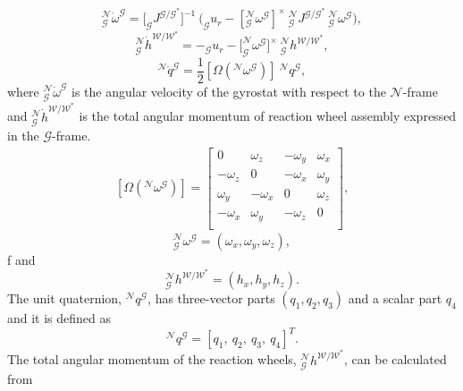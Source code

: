 \documentclass[journal ]{new-aiaa}
\begin{document}
\begin{equation} \label{Euler_RBD1}
_\mathcal{G}^\mathcal{N}\dot{\omega}^\mathcal{G} =\big[ _\mathcal{G}J^{\mathcal{G/G^*}}\big]^{-1}\ \Big( _\mathcal{G}u_r- [_\mathcal{G}^\mathcal{N}\omega^\mathcal{G}]^{ \times} \ _\mathcal{G}^\mathcal{N}J^{\mathcal{G/G^*}}\ _\mathcal{G}^\mathcal{N}\omega^\mathcal{G}\Big),
\end{equation} 
\begin{equation}\label{wheelangmom}
_\mathcal{G}^\mathcal{N}\dot{h}^{\mathcal{W}/\mathcal{W}^*}=-_\mathcal{G}u_r-\big[_\mathcal{G}^\mathcal{N}\omega^\mathcal{G}\big]^\times\ _\mathcal{G}^\mathcal{N}h^{\mathcal{W}/\mathcal{W}^*},
\end{equation}
\begin{equation} \label{kinematics}
^\mathcal{N}\dot{q}^\mathcal{G}
 = \frac{1}{2}[ \Omega(^\mathcal{N}\omega^\mathcal{G})]\ ^\mathcal{N}q^\mathcal{G}, 
\end{equation}
where $_\mathcal{G}^\mathcal{N}\dot{\omega}^\mathcal{G}$ is the angular velocity of the gyrostat with respect to the $\mathcal{N}$-frame and $_\mathcal{G}^\mathcal{N}\dot{h}^{\mathcal{W}/\mathcal{W^*}}$ is the total angular momentum of reaction wheel assembly expressed in the $\mathcal{G}$-frame.
\begin{gather} \label{k_omega}
[ \Omega(^\mathcal{N}\omega^\mathcal{G})] =
\begin{bmatrix}
0 & \omega_z & -\omega_y & \omega_x \\
-\omega_z & 0 & -\omega_x & \omega_y \\
\omega_y & -\omega_x & 0 & \omega_z \\ 
-\omega_x & \omega_y & -\omega_z & 0 \\ 
\end{bmatrix},
\end{gather}
\begin{equation}
_\mathcal{G}^\mathcal{N}\omega^\mathcal{G}=(\omega_x, \omega_y, \omega_z), 
\end{equation}f
and
\begin{equation}
_\mathcal{G}^\mathcal{N}h^{\mathcal{W}/\mathcal{W^*}}=(h_x, h_y, h_z).
\end{equation}
The unit quaternion, $^\mathcal{N}q^\mathcal{G}$, has three-vector parts $(q_1, q_2, q_3)$ and a scalar part $q_4$ and it is defined as
\begin{equation}
^\mathcal{N}q^\mathcal{G}=[q_1,\ q_2,\ q_3,\ q_4]^T.
\end{equation}
The total angular momentum of the reaction wheels, $_\mathcal{G}^\mathcal{N}h^{\mathcal{W}/\mathcal{W}^*}$, can be calculated from
\end{document}
